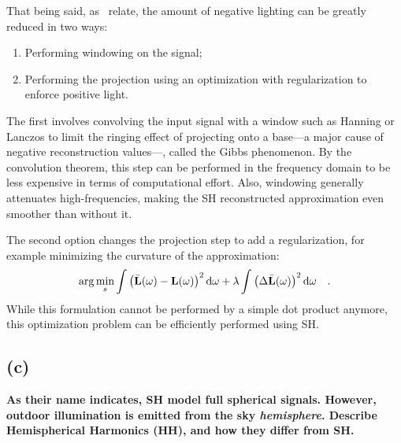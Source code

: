 \documentclass{report}
\begin{document}
That being said, as~\cite{Sloan2008} relate, the amount of negative lighting can be greatly reduced in two ways:
\begin{enumerate}
  \item{Performing windowing on the signal;}
  \item{Performing the projection using an optimization with regularization to enforce positive light.}
\end{enumerate}
The first involves convolving the input signal with a window such as Hanning or Lanczos to limit the ringing effect of projecting onto a base---a major cause of negative reconstruction values---, called the Gibbs phenomenon. By the convolution theorem, this step can be performed in the frequency domain to be less expensive in terms of computational effort. Also, windowing generally attenuates high-frequencies, making the SH reconstructed approximation even smoother than without it.

The second option changes the projection step to add a regularization, for example minimizing the curvature of the approximation:
\begin{equation}
\arg \min_s \int\left( \bar{\mathbf{L}}(\omega) - \mathbf{L}(\omega)\right)^2 \mathrm{d}\omega + \lambda \int \left(\Delta \bar{\mathbf{L}}(\omega)\right)^2 \mathrm{d}\omega
\quad.
\end{equation}
While this formulation cannot be performed by a simple dot product anymore, this optimization problem can be efficiently performed using SH.

\subsection{(c)}
\textbf{As their name indicates, SH model full spherical signals. However, outdoor illumination is emitted from the sky \emph{hemisphere}. Describe Hemispherical Harmonics (HH), and how they differ from SH.}
\end{document}
